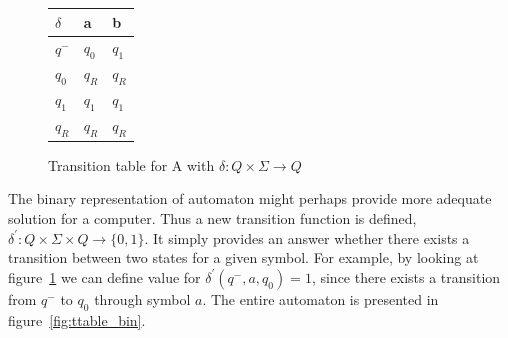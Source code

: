 \documentclass{mini}
\begin{document}
%
%
\begin{figure}[H]
    \CenterFloatBoxes
    \begin{floatrow}
        
        \ttabbox
        {
            \centering
            \setlength{\tabcolsep}{15pt}
            \renewcommand{\arraystretch}{1.5}
            \begin{tabular}{|P{1.0cm} || P{0.6cm} | P{0.6cm} |}
                \hline
                $\delta$ & a & b \\
                \hline
                \hline
                $q^-$ 		& $q_0$ & $q_1$ \\
                \hline
                $q_0 $ 		& $q_R$ & $q_R$ \\
                \hline
                $q_1 $ 		& $q_1$ & $q_1$ \\
                \hline
                $q_R$  					& $q_R$ & $q_R$ \\
                \hline
            \end{tabular}
        }
        {\caption{Transition table for A with $\delta: Q \times \Sigma \rightarrow Q$}\label{fig:ttable_std}}
        
        
    \end{floatrow}
\end{figure}


The binary representation of automaton might perhaps provide more adequate solution for a computer. Thus a new transition function is defined, $\delta^{'}: Q \times \Sigma \times Q \rightarrow \{0,1\}$. It simply provides an answer whether there exists a transition between two states for a given symbol. For example, by looking at figure~\ref{fig:ttable_std} we can define value for $\delta^{'}(q^-,a,q_0) = 1$, since there exists a transition from $q^-$ to $q_0$ through symbol $a$. The entire automaton is presented in figure~\ref{fig:ttable_bin}.
\end{document}
